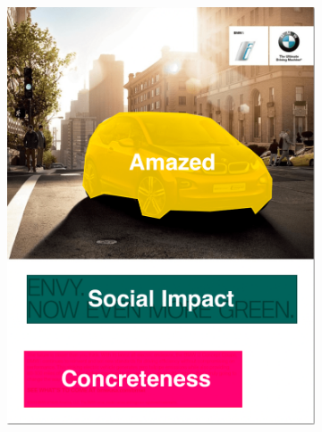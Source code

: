 \begin{figure}[!h]
\begin{subfigure}[b]{0.24\textwidth}
         \includegraphics[scale=0.22]{images/Image3_Segment.png}
     \end{subfigure}
     

\end{figure}
